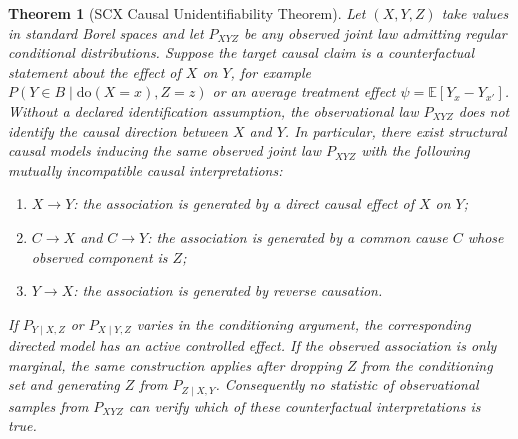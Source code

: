 \documentclass[12pt,a4paper]{article}
\newtheorem{theorem}{Theorem}[section]
\begin{document}
\begin{theorem}[SCX Causal Unidentifiability Theorem]
\label{thm:causal_unident}
Let $(X,Y,Z)$ take values in standard Borel spaces and let
$P_{XYZ}$ be any observed joint law admitting regular conditional
distributions.  Suppose the target causal claim is a counterfactual
statement about the effect of $X$ on $Y$, for example
$P(Y \in B \mid \mathrm{do}(X=x),Z=z)$ or an average treatment effect
$\psi = \mathbb{E}[Y_x - Y_{x'}]$.  Without a declared identification
assumption, the observational law $P_{XYZ}$ does not identify the causal
direction between $X$ and $Y$.  In particular, there exist structural causal
models inducing the same observed joint law $P_{XYZ}$ with the following
mutually incompatible causal interpretations:
\begin{enumerate}[label=(\alph*), leftmargin=*]
    \item $X \to Y$: the association is generated by a direct causal effect
    of $X$ on $Y$;
    \item $C \to X$ and $C \to Y$: the association is generated by a common
    cause $C$ whose observed component is $Z$;
    \item $Y \to X$: the association is generated by reverse causation.
\end{enumerate}
If $P_{Y\mid X,Z}$ or $P_{X\mid Y,Z}$ varies in the conditioning argument,
the corresponding directed model has an active controlled effect.  If the
observed association is only marginal, the same construction applies after
dropping $Z$ from the conditioning set and generating $Z$ from
$P_{Z\mid X,Y}$.
Consequently no statistic of observational samples from $P_{XYZ}$ can
verify which of these counterfactual interpretations is true.
\end{theorem}
\end{document}
